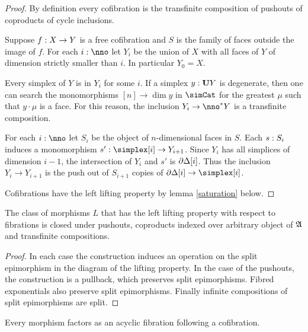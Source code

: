 \documentclass[csh.tex]{subfiles}
\begin{document}
\begin{proof} By definition every cofibration is the transfinite composition of pushouts of coproducts of cycle inclusions.

Suppose $f: X\to Y$ is a free cofibration and $S$ is the family of faces outside the image of $f$. For each $i\of\nno$ let $Y_i$ be the union of $X$ with all faces of $Y$ of dimension strictly smaller than $i$. In particular $Y_0=X$.

Every simplex of $Y$ is in $Y_i$ for some $i$. If a simplex $y:\mathbf{U} Y$ is degenerate, then one can search the monomorphisms $[n]\to\dim y$ in $\simCat$ for the greatest $\mu$ such that $y\cdot\mu$ is a face. For this reason, the inclusion $Y_i\to\nno\ri Y$ is a transfinite composition.

For each $i\of\nno$ let $S_i$ be the object of $n$-dimensional faces in $S$. Each $s: S_i$ induces a monomorphism $s'\of\simplex[i]\to Y_{i+1}$. Since $Y_{i}$ has all simplices of dimension $i-1$, the intersection of $Y_i$ and $s'$ is $\partial\Delta[i]$. Thus the inclusion $Y_i\to Y_{i+1}$ is the push out of $S_{i+1}$ copies of $\cycle[i]\to\simplex[i]$. 

Cofibrations have the left lifting property by lemma \ref{saturation} below.
\end{proof}


\begin{lemma} The class of morphisms $L$ that has the left lifting property with respect to fibrations is closed under pushouts, coproducts indexed over arbitrary object of $\mathfrak A$ and transfinite compositions. \label{saturation}
\end{lemma}

\begin{proof}
In each case the construction induces an operation on the split epimorphism in the diagram of the lifting property. 
In the case of the pushouts, the construction is a pullback, which preserves split epimorphisms.
Fibred exponentials also preserve split epimorphisms. Finally infinite compositions of split epimorphisms are split.
\end{proof}


\begin{proposition} Every morphism factors as an acyclic fibration following a cofibration. \label{factor1} \end{proposition}
\end{document}
